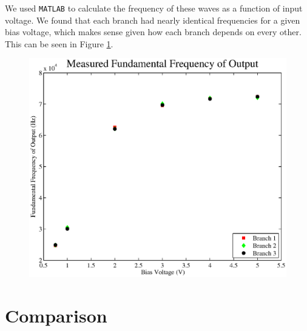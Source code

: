 \documentclass{article}
\begin{document}
We used \texttt{MATLAB} to calculate the frequency of these waves as a function of input voltage.  We found that each branch had nearly identical frequencies for a given bias voltage, which makes sense given how each branch depends on every other.  This can be seen in Figure \ref{freqs}.

\begin{figure}[H]
\centering
\includegraphics[scale=.5]{freqs.eps}
\caption{}
\label{freqs}
\end{figure}

\section{Comparison}
\end{document}
